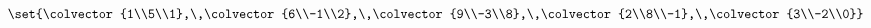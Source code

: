 $\set{\colvector{1\\5\\1},\,\colvector{6\\-1\\2},\,\colvector{9\\-3\\8},\,\colvector{2\\8\\-1},\,\colvector{3\\-2\\0}}$